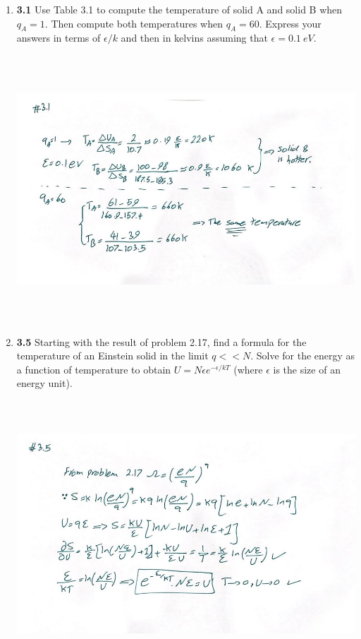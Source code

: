\documentclass[fleqn]{article}
\begin{document}
  \begin{enumerate}
    \item \textbf{3.1} Use Table 3.1 to compute the temperature of solid A and solid B when $q_A=1$. Then
    compute both temperatures when $q_A=60$. Express your answers in terms of $\epsilon/k$ and then in 
    kelvins assuming that $\epsilon=0.1 ~ eV$.

      \begin{center}
        \includegraphics[height=10cm, width=14cm]{1.JPG}
      \end{center}

    \pagebreak

    \item \textbf{3.5} Starting with the result of problem 2.17, find a formula for the temperature of an Einstein 
    solid in the limit $q << N$. Solve for the energy as a function of temperature to obtain 
    $U=N \epsilon e^{-\epsilon/k T}$ (where $\epsilon$ is the size of an energy unit).

      \begin{center}
        \includegraphics[height=10cm, width=14cm]{2.JPG}
      \end{center}


\end{enumerate}
\end{document}
